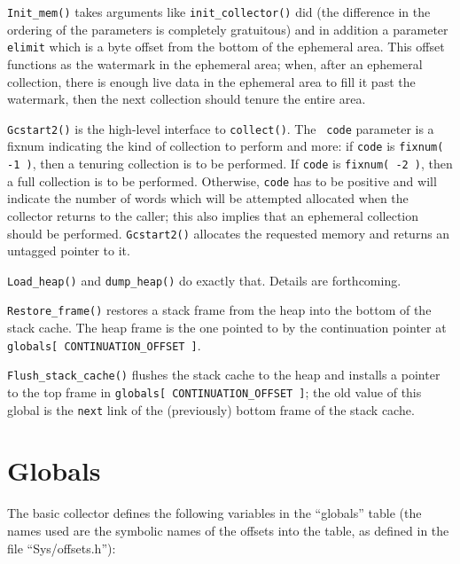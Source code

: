 {\tt Init\_mem()} takes arguments like {\tt init\_collector()} did (the
difference in the ordering of the parameters is completely gratuitous) and
in addition a parameter {\tt elimit} which is a byte offset from the bottom
of the ephemeral area. This offset functions as the watermark in the
ephemeral area; when, after an ephemeral collection, there is enough live
data in the ephemeral area to fill it past the watermark, then the next
collection should tenure the entire area.

{\tt Gcstart2()} is the high-level interface to {\tt collect()}. The {\tt
code} parameter is a fixnum indicating the kind of collection to perform and
more: if {\tt code} is {\tt fixnum( -1 )}, then a tenuring collection is to
be performed. If {\tt code} is {\tt fixnum( -2 )}, then a full collection is
to be performed. Otherwise, {\tt code} has to be positive and will indicate
the number of words which will be attempted allocated when the collector
returns to the caller; this also implies that an ephemeral collection should
be performed. {\tt Gcstart2()} allocates the requested memory and returns
an untagged pointer to it.

{\tt Load\_heap()} and {\tt dump\_heap()} do exactly that. Details are
forthcoming.

{\tt Restore\_frame()} restores a stack frame from the heap into the bottom
of the stack cache. The heap frame is the one pointed to by the continuation
pointer at {\tt globals[ CONTINUATION\_OFFSET ]}.

{\tt Flush\_stack\_cache()} flushes the stack cache to the heap and installs
a pointer to the top frame in {\tt globals[ CONTINUATION\_OFFSET ]}; the
old value of this global is the {\tt next} link of the (previously) bottom 
frame of the stack cache.


\section{Globals}

The basic collector defines the following variables in the ``globals'' table
(the names used are the symbolic names of the offsets into the table, as
defined in the file ``Sys/offsets.h''):

